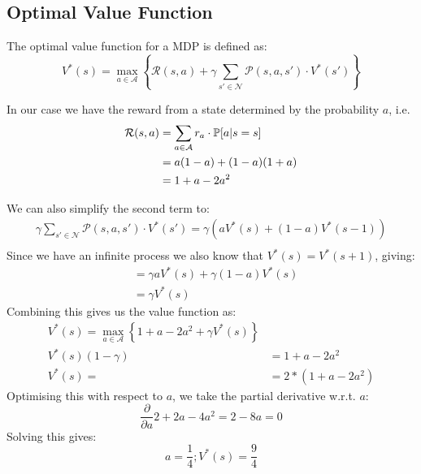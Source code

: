 \documentclass[11pt]{article}
\begin{document}
\subsection{Optimal Value Function}
The optimal value function for a MDP is defined as:
$$
V^*(s) = \max_{a\in\mathcal{A}} \left\{\mathcal{R}(s, a) + \gamma\sum_{s'\in\mathcal{N}}\mathcal{P}(s, a, s')\cdot V^*(s') \right\}
$$

In our case we have the reward from a state determined by the probability $a$, i.e. 
\begin{align}
    \mathcal{R}(s, a) &= \sum_{a\in\mathcal{A}}r_a\cdot\P{a|s = s} \\
                      &= a(1 - a) + (1-a)(1+a) \\
                      &= 1 + a - 2a^2 \\
\end{align}

We can also simplify the second term to:
\begin{align}
    \gamma\sum_{s'\in\mathcal{N}}\mathcal{P}(s, a, s')\cdot V^*(s') = \gamma(aV^*(s) + (1-a)V^*(s-1)) \\
\end{align}
Since we have an infinite process we also know that $V^*(s) = V^*(s+1)$, giving:
\begin{align}
    &= \gamma aV^*(s) + \gamma(1-a)V^*(s) \\
    &= \gamma V^*(s)
\end{align}
Combining this gives us the value function as:
\begin{align}
    V^*(s) = \max_{a\in\mathcal{A}} \left\{1 + a - 2a^2 + \gamma V^*(s) \right\}\\
    V^*(s)(1 - \gamma) &= 1 + a  - 2a^2 \\
    V^*(s) = &= 2 * (1 + a - 2a^2)
\end{align}
Optimising this with respect to $a$, we take the partial derivative w.r.t. $a$:
$$
\frac{\partial}{\partial a} 2 + 2a - 4a^2 = 2 - 8a = 0
$$
Solving this gives:
$$
a = \frac{1}{4}; V^*(s) = \frac{9}{4}
$$
\end{document}
